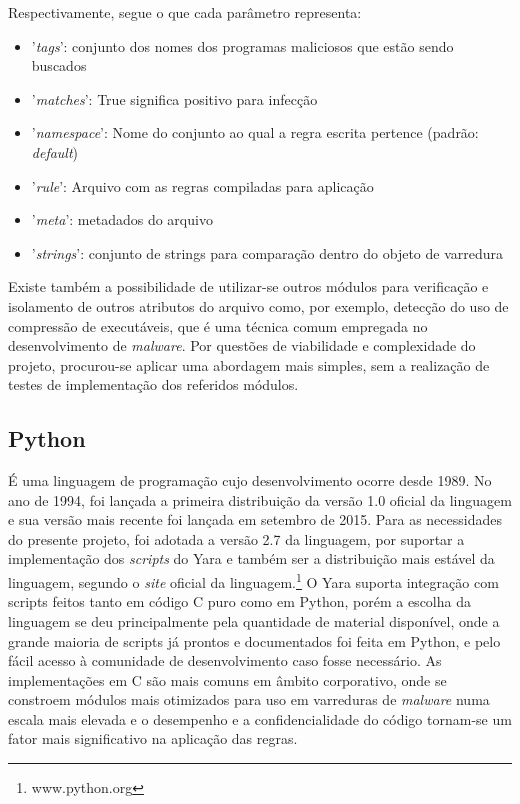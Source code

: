 Respectivamente, segue o que cada parâmetro representa:
\begin{itemize}
	\item '\textit{tags}': conjunto dos nomes dos programas maliciosos que estão sendo buscados

	\item '\textit{matches}': True significa positivo para infecção
	
	\item '\textit{namespace}': Nome do conjunto ao qual a regra escrita pertence (padrão: \textit{default})

	\item '\textit{rule}': Arquivo com as regras compiladas para aplicação

	\item '\textit{meta}': metadados do arquivo

	\item '\textit{strings}': conjunto de strings para comparação dentro do objeto de varredura
\end{itemize}

Existe também a possibilidade de utilizar-se outros módulos para verificação e
isolamento de outros atributos do arquivo como, por exemplo, detecção do uso de
compressão de executáveis, que é uma técnica comum empregada no desenvolvimento
de \textit{malware}. Por questões de viabilidade e complexidade do projeto,
procurou-se aplicar uma abordagem mais simples, sem a realização de testes de
implementação dos referidos módulos.

\subsection{Python}
\label{sub:python}

É uma linguagem de programação cujo desenvolvimento ocorre desde 1989. No ano de
1994, foi lançada a primeira distribuição da versão 1.0 oficial da linguagem e
sua versão mais recente foi lançada em setembro de 2015. Para as necessidades do
presente projeto, foi adotada a versão 2.7 da linguagem, por suportar a
implementação dos \textit{scripts} do Yara e também ser a distribuição mais
estável da linguagem, segundo o \textit{site} oficial da linguagem.\footnote{www.python.org} O
Yara suporta integração com scripts feitos tanto em código C puro como em
Python, porém a escolha da linguagem se deu principalmente pela quantidade de
material disponível, onde a grande maioria de scripts já prontos e documentados
foi feita em Python,  e pelo fácil acesso à comunidade de desenvolvimento caso
fosse necessário. As implementações em C são mais comuns em âmbito corporativo,
onde se constroem módulos mais otimizados para uso em varreduras de
\textit{malware} numa escala mais elevada e o desempenho e a confidencialidade
do código tornam-se um fator mais significativo na aplicação das regras.

